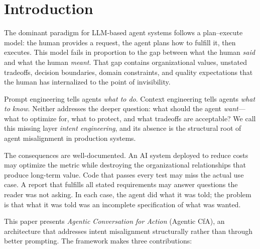 \documentclass[11pt,a4paper]{article}
\begin{document}
\section{Introduction}
\label{sec:introduction}

The dominant paradigm for LLM-based agent systems follows a plan--execute
model: the human provides a request, the agent plans how to fulfill it, then
executes. This model fails in proportion to the gap between what the human
\emph{said} and what the human \emph{meant}. That gap contains organizational
values, unstated tradeoffs, decision boundaries, domain constraints, and
quality expectations that the human has internalized to the point of
invisibility.

Prompt engineering tells agents \emph{what to do}. Context engineering tells
agents \emph{what to know}. Neither addresses the deeper question: what should
the agent \emph{want}---what to optimize for, what to protect, and what
tradeoffs are acceptable? We call this missing layer \emph{intent engineering},
and its absence is the structural root of agent misalignment in production
systems.

The consequences are well-documented. An AI system deployed to reduce costs
may optimize the metric while destroying the organizational relationships that
produce long-term value. Code that passes every test may miss the actual use
case. A report that fulfills all stated requirements may answer questions the
reader was not asking. In each case, the agent did what it was told; the
problem is that what it was told was an incomplete specification of what was
wanted.

This paper presents \emph{Agentic Conversation for Action} (Agentic CfA), an
architecture that addresses intent misalignment structurally rather than
through better prompting. The framework makes three contributions:
\end{document}
